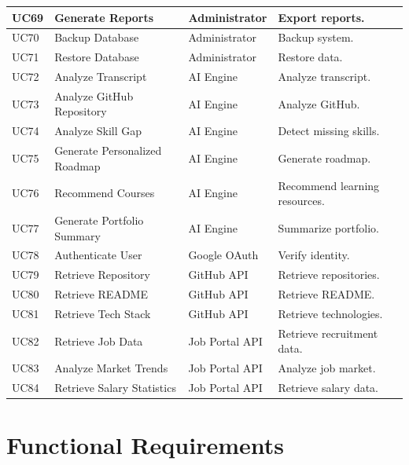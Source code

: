 \begin{longtable}{|>{\centering\arraybackslash}p{1cm}|p{4cm}|p{3.3cm}|p{7.2cm}|}
UC69 &
Generate Reports &
Administrator &
Export reports.
\\
\hline

UC70 &
Backup Database &
Administrator &
Backup system.
\\
\hline

UC71 &
Restore Database &
Administrator &
Restore data.
\\
\hline

UC72 &
Analyze Transcript &
AI Engine &
Analyze transcript.
\\
\hline

UC73 &
Analyze GitHub Repository &
AI Engine &
Analyze GitHub.
\\
\hline

UC74 &
Analyze Skill Gap &
AI Engine &
Detect missing skills.
\\
\hline

UC75 &
Generate Personalized Roadmap &
AI Engine &
Generate roadmap.
\\
\hline

UC76 &
Recommend Courses &
AI Engine &
Recommend learning resources.
\\
\hline

UC77 &
Generate Portfolio Summary &
AI Engine &
Summarize portfolio.
\\
\hline

UC78 &
Authenticate User &
Google OAuth &
Verify identity.
\\
\hline

UC79 &
Retrieve Repository &
GitHub API &
Retrieve repositories.
\\
\hline

UC80 &
Retrieve README &
GitHub API &
Retrieve README.
\\
\hline

UC81 &
Retrieve Tech Stack &
GitHub API &
Retrieve technologies.
\\
\hline

UC82 &
Retrieve Job Data &
Job Portal API &
Retrieve recruitment data.
\\
\hline

UC83 &
Analyze Market Trends &
Job Portal API &
Analyze job market.
\\
\hline

UC84 &
Retrieve Salary Statistics &
Job Portal API &
Retrieve salary data.
\\
\hline

\end{longtable}

\section{Functional Requirements}

